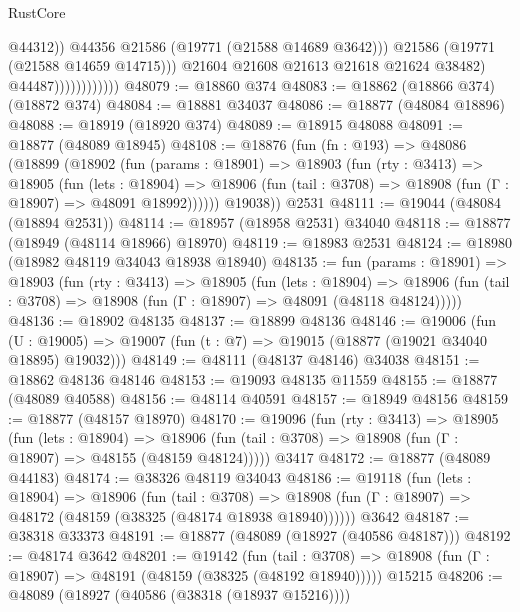 \begin{lexlean}{RustCore}
\begin{coremodule}
                                      @44312))
                                  @44356
                                  @21586
                                  (@19771 (@21588 @14689 @3642)))
                                @21586
                                (@19771 (@21588 @14659 @14715)))
                              @21604
                              @21608
                              @21613
                              @21618
                              @21624
                              @38482)
                            @44487))))))))))))
@48079 := @18860 @374
@48083 := @18862 (@18866 @374) (@18872 @374)
@48084 := @18881 @34037
@48086 := @18877 (@48084 @18896)
@48088 := @18919 (@18920 @374)
@48089 := @18915 @48088
@48091 := @18877 (@48089 @18945)
@48108 := @18876
    (fun (fn : @193) =>
    @48086
      (@18899
        (@18902
          (fun (params : @18901) =>
          @18903
            (fun (rty : @3413) =>
            @18905
              (fun (lets : @18904) =>
              @18906 (fun (tail : @3708) => @18908 (fun (Γ : @18907) => @48091 @18992))))))
        @19038))
    @2531
@48111 := @19044 (@48084 (@18894 @2531))
@48114 := @18957 (@18958 @2531) @34040
@48118 := @18877 (@18949 (@48114 @18966) @18970)
@48119 := @18983 @2531
@48124 := @18980 (@18982 @48119 @34043 @18938 @18940)
@48135 := fun (params : @18901) =>
  @18903
    (fun (rty : @3413) =>
    @18905
      (fun (lets : @18904) =>
      @18906 (fun (tail : @3708) => @18908 (fun (Γ : @18907) => @48091 (@48118 @48124)))))
@48136 := @18902 @48135
@48137 := @18899 @48136
@48146 := @19006
    (fun (U : @19005) => @19007 (fun (t : @7) => @19015 (@18877 (@19021 @34040 @18895) @19032)))
@48149 := @48111 (@48137 @48146) @34038
@48151 := @18862 @48136 @48146
@48153 := @19093 @48135 @11559
@48155 := @18877 (@48089 @40588)
@48156 := @48114 @40591
@48157 := @18949 @48156
@48159 := @18877 (@48157 @18970)
@48170 := @19096
    (fun (rty : @3413) =>
    @18905
      (fun (lets : @18904) =>
      @18906 (fun (tail : @3708) => @18908 (fun (Γ : @18907) => @48155 (@48159 @48124)))))
    @3417
@48172 := @18877 (@48089 @44183)
@48174 := @38326 @48119 @34043
@48186 := @19118
    (fun (lets : @18904) =>
    @18906
      (fun (tail : @3708) =>
      @18908 (fun (Γ : @18907) => @48172 (@48159 (@38325 (@48174 @18938 @18940))))))
    @3642
@48187 := @38318 @33373
@48191 := @18877 (@48089 (@18927 (@40586 @48187)))
@48192 := @48174 @3642
@48201 := @19142
    (fun (tail : @3708) => @18908 (fun (Γ : @18907) => @48191 (@48159 (@38325 (@48192 @18940)))))
    @15215
@48206 := @48089 (@18927 (@40586 (@38318 (@18937 @15216))))

\end{coremodule}
\end{lexlean}
